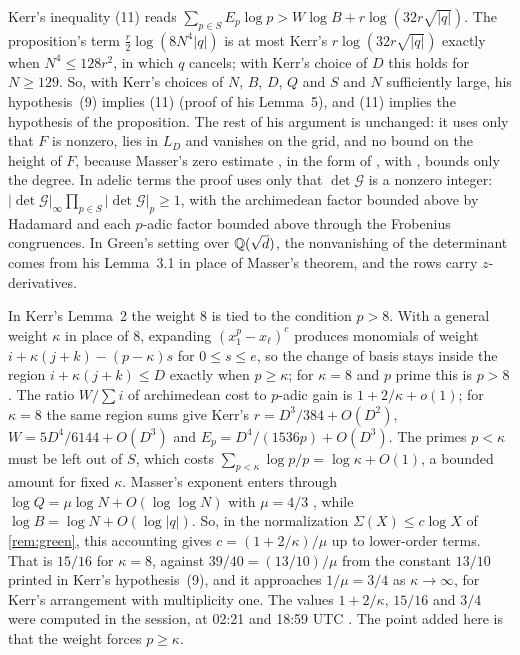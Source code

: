 Kerr's inequality (11) reads $\sum_{p\in S}E_p\log p > W\log B + r\log(32r\sqrt{|q|})$. The proposition's term $\tfrac r2 \log(8N^4|q|)$ is at most Kerr's $r\log(32r\sqrt{|q|})$ exactly when $N^4 \le 128 r^2$, in which $q$ cancels; with Kerr's choice of $D$ this holds for $N \ge 129$. So, with Kerr's choices of $N$, $B$, $D$, $Q$ and $S$ and $N$ sufficiently large, his hypothesis~(9) implies (11) (proof of his Lemma~5), and (11) implies the hypothesis of the proposition. The rest of his argument is unchanged: it uses only that $F$ is nonzero, lies in $L_D$ and vanishes on the grid, and no bound on the height of $F$, because Masser's zero estimate \cite{Masser1981}, in the form of \cite[Lemma~6]{Kerr2026}, with \cite[Lemma~7]{Kerr2026}, bounds only the degree. In adelic terms the proof uses only that $\det \mathcal G$ is a nonzero integer: $|\det \mathcal G|_\infty \prod_{p\in S}|\det \mathcal G|_p \ge 1$, with the archimedean factor bounded above by Hadamard and each $p$-adic factor bounded above through the Frobenius congruences. In Green's setting over $\mathbb{Q}(\sqrt d)$, the nonvanishing of the determinant comes from his Lemma~3.1 in place of Masser's theorem, and the rows carry $z$-derivatives.

\begin{remark}\label{rem:weight}
In Kerr's Lemma~2 the weight $8$ is tied to the condition $p > 8$. With a general weight $\kappa$ in place of $8$, expanding $(x_1^p - x_\ell)^e$ produces monomials of weight $i + \kappa(j+k) - (p-\kappa)s$ for $0 \le s \le e$, so the change of basis stays inside the region $i + \kappa(j+k) \le D$ exactly when $p \ge \kappa$; for $\kappa = 8$ and $p$ prime this is $p > 8$. The ratio $W/\sum i$ of archimedean cost to $p$-adic gain is $1 + 2/\kappa + o(1)$; for $\kappa = 8$ the same region sums give Kerr's $r = D^3/384 + O(D^2)$, $W = 5D^4/6144 + O(D^3)$ and $E_p = D^4/(1536p) + O(D^3)$. The primes $p < \kappa$ must be left out of $S$, which costs $\sum_{p<\kappa}\log p/p = \log \kappa + O(1)$, a bounded amount for fixed $\kappa$. Masser's exponent enters through $\log Q = \mu\log N + O(\log\log N)$ with $\mu = 4/3$ \cite[Lemma~7, proof of Theorem~1]{Kerr2026}, while $\log B = \log N + O(\log|q|)$. So, in the normalization $\Sigma(X) \le c\log X$ of \cref{rem:green}, this accounting gives $c = (1 + 2/\kappa)/\mu$ up to lower-order terms. That is $15/16$ for $\kappa = 8$, against $39/40 = (13/10)/\mu$ from the constant $13/10$ printed in Kerr's hypothesis~(9), and it approaches $1/\mu = 3/4$ as $\kappa \to \infty$, for Kerr's arrangement with multiplicity one. The values $1 + 2/\kappa$, $15/16$ and $3/4$ were computed in the session, at 02:21 and 18:59 UTC \cite{OMOSsession2026}. The point added here is that the weight forces $p \ge \kappa$.
\end{remark}


